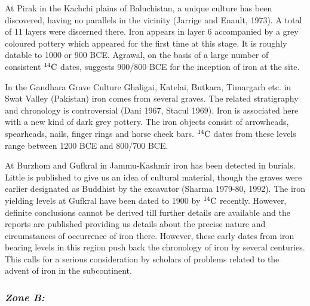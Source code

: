 At Pirak in the Kachchi plains of Baluchistan, a unique culture has been discovered, having no parallels in the vicinity (Jarrige and Enault, 1973). A total of 11 layers were discerned there. Iron appears in layer 6 accompanied by a grey coloured pottery which appeared for the first time at this stage. It is roughly datable to 1000 or 900 BCE. Agrawal, on the basis of a large number of consistent $^{14}{\rm C}$ dates, suggests 900/800 BCE for the inception of iron at the site.

In the Gandhara Grave Culture Ghaligai, Katelai, Butkara, Timargarh etc. in Swat Valley (Pakistan) iron comes from several graves. The related stratigraphy and chronology is controversial (Dani 1967, Stacul 1969). Iron is associated here with a new kind of dark grey pottery. The iron objects consist of arrowheads, spearheads, nails, finger rings and horse cheek bars. $^{14}{\rm C}$ dates from these levels range between 1200 BCE and 800/700 BCE.

At Burzhom and Gufkral in Jammu-Kashmir iron has been detected in burials. Little is published to give us an idea of cultural material, though the graves were earlier designated as Buddhist by the excavator (Sharma 1979-80, 1992). The iron yielding levels at Gufkral have been dated to 1900 by $^{14}{\rm C}$ recently. However, definite conclusions cannot be derived till further details are available and the reports are published providing us details about the precise nature and circumstances of occurrence of iron there. However, these early dates from iron bearing levels in this region push back the chronology of iron by several centuries. This calls for a serious consideration by scholars of problems related to the advent of iron in the subcontinent.

\subsubsection*{\textit{Zone B:}}

